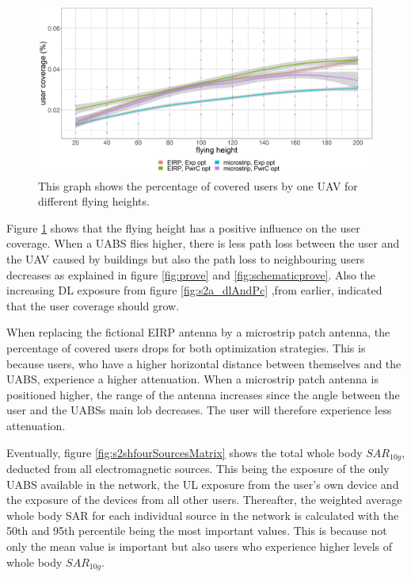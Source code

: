 \begin{figure}[h]
  \includegraphics[width=\textwidth]{../results/s2/fhvscov.png}
  \caption{This graph shows the percentage of covered users by one \gls{UAV} for different flying heights.}
  \label{fig:s2fhvscov}
\end{figure}

Figure  \ref{fig:s2fhvscov} shows that the flying height has a positive influence on the user coverage. 
When a \gls{UABS} flies higher, there is less path loss between the user and the \gls{UAV} caused by buildings but also the path loss to neighbouring 
users decreases as explained 
in figure \ref{fig:prove} and \ref{fig:schematicprove}. 
Also the increasing \gls{DL} exposure  from figure \ref{fig:s2a_dlAndPc} ,from earlier, indicated that the
user coverage should grow.

When replacing the fictional \gls{EIRP} antenna by a microstrip patch antenna, the percentage of covered users drops for both 
optimization strategies. This is because users, who have a higher horizontal distance between themselves and the \gls{UABS}, 
experience a higher attenuation. When a microstrip patch antenna is positioned higher, the range of the antenna increases 
since the angle between the user and the \gls{UABS}s main lob decreases. The user will therefore experience less attenuation.

Eventually, figure \ref{fig:s2shfourSourcesMatrix} shows the total whole body $SAR_{10g}$, deducted from all electromagnetic sources. This being the exposure 
of the only \gls{UABS} available in the network, 
 the \gls{UL} exposure from the user’s own device and the exposure of the devices from all other users. 
 Thereafter, the weighted average whole body \gls{SAR} for each individual source in the network is calculated with the 50th and 95th percentile 
 being the most important values. This is because not only the mean value is important but also users who experience higher 
 levels of whole body $SAR_{10g}$.

